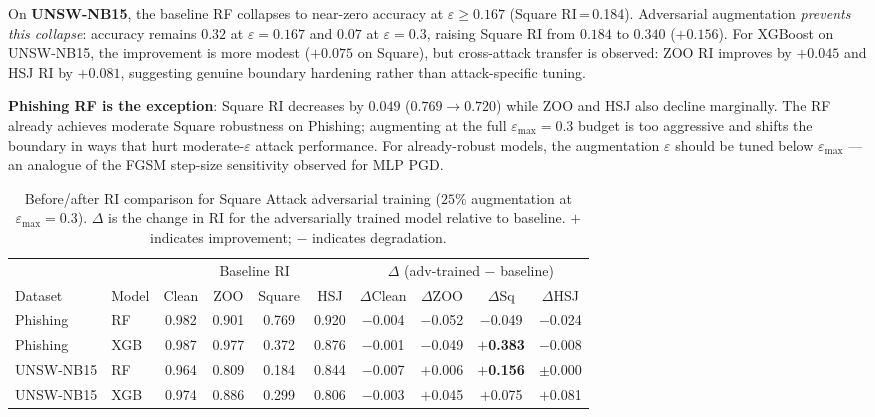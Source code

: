 \documentclass[runningheads]{llncs}
\begin{document}
On \textbf{UNSW-NB15}, the baseline RF collapses to near-zero accuracy at
$\varepsilon \geq 0.167$ (Square RI\,=\,0.184).  Adversarial augmentation
\emph{prevents this collapse}: accuracy remains $0.32$ at $\varepsilon=0.167$
and $0.07$ at $\varepsilon=0.3$, raising Square RI from $0.184$ to $0.340$
($+0.156$).  For XGBoost on UNSW-NB15, the improvement is more modest
($+0.075$ on Square), but cross-attack transfer is observed: ZOO RI improves
by $+0.045$ and HSJ RI by $+0.081$, suggesting genuine boundary hardening
rather than attack-specific tuning.

\textbf{Phishing RF is the exception}: Square RI decreases by $0.049$
($0.769 \to 0.720$) while ZOO and HSJ also decline marginally.  The RF already
achieves moderate Square robustness on Phishing; augmenting at the full
$\varepsilon_{\max}=0.3$ budget is too aggressive and shifts the boundary in
ways that hurt moderate-$\varepsilon$ attack performance.  For already-robust models, the augmentation $\varepsilon$ should be tuned
below $\varepsilon_{\max}$ ---
an analogue of the FGSM step-size sensitivity observed for MLP PGD.

\begin{table}[t]
\caption{Before/after RI comparison for Square Attack adversarial training
($25\%$ augmentation at $\varepsilon_{\max}=0.3$).
$\Delta$ is the change in RI for the adversarially trained model relative to
baseline.  $+$ indicates improvement; $-$ indicates degradation.}
\label{tab:advtrain}
\centering
\small
\begin{tabular}{llcccccccc}
\toprule
& & \multicolumn{4}{c}{Baseline RI} & \multicolumn{4}{c}{$\Delta$ (adv-trained $-$ baseline)} \\
\cmidrule(lr){3-6}\cmidrule(lr){7-10}
Dataset & Model & Clean & ZOO & Square & HSJ & $\Delta$Clean & $\Delta$ZOO & $\Delta$Sq & $\Delta$HSJ \\
\midrule
Phishing   & RF  & 0.982 & 0.901 & 0.769 & 0.920 & $-$0.004 & $-$0.052 & $-$0.049 & $-$0.024 \\
Phishing   & XGB & 0.987 & 0.977 & 0.372 & 0.876 & $-$0.001 & $-$0.049 & \textbf{$+$0.383} & $-$0.008 \\
UNSW-NB15  & RF  & 0.964 & 0.809 & 0.184 & 0.844 & $-$0.007 & $+$0.006 & \textbf{$+$0.156} & $\pm$0.000 \\
UNSW-NB15  & XGB & 0.974 & 0.886 & 0.299 & 0.806 & $-$0.003 & $+$0.045 & $+$0.075 & $+$0.081 \\
\bottomrule
\end{tabular}
\end{table}
\end{document}
